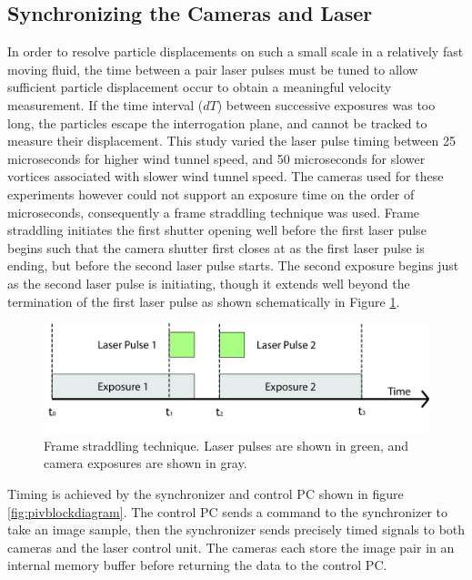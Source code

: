 \subsection{Synchronizing the Cameras and Laser}
In order to resolve particle displacements on such a small scale in a 
relatively fast moving fluid, the time between a pair laser pulses must be 
tuned to allow sufficient particle displacement occur to obtain a meaningful 
velocity measurement. If the time interval ($dT$) between successive exposures 
was too long, the particles escape the interrogation plane, and cannot be 
tracked to measure their displacement. This study varied the laser pulse timing 
between 25 microseconds for higher wind tunnel speed, and 50 microseconds for 
slower vortices associated with slower wind tunnel speed. The cameras used for 
these experiments however could not support an exposure time on the order of 
microseconds, consequently a frame straddling technique was used. Frame 
straddling initiates the first shutter opening well before the first laser 
pulse begins such that the camera shutter first closes at as the first laser 
pulse is ending, but before the second laser pulse starts. The second exposure 
begins just as the second laser pulse is initiating, though it extends well 
beyond the termination of the first laser pulse as shown schematically in 
Figure \ref{fig:frame_straddling}. 

\begin{figure}
	\centering
	\includegraphics[width=5.5in]{figs/piv_method/frame_straddling}
	\caption{Frame straddling technique. Laser pulses are shown in green, and 
		camera exposures are shown in gray.}
	\label{fig:frame_straddling}
\end{figure}

Timing is achieved by the synchronizer and control PC shown in figure 
\ref{fig:pivblockdiagram}. The control PC sends a command to the synchronizer 
to take an image sample, then the synchronizer sends precisely timed signals to 
both cameras and the laser control unit. The cameras each store the image pair 
in an internal memory buffer before returning the data to the control PC.

